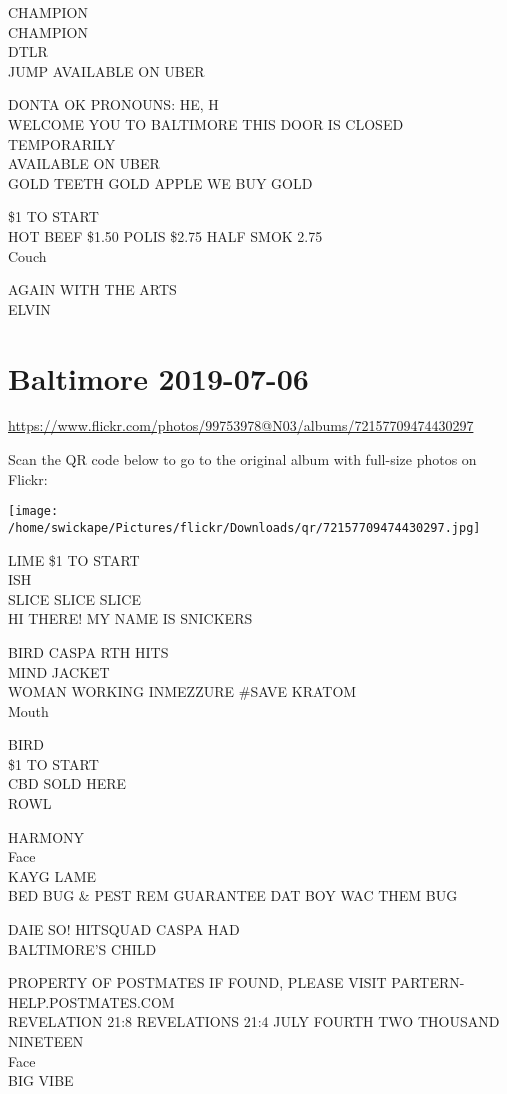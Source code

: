 \documentclass[10pt,letterpaper]{article}
\begin{document}
CHAMPION\\
CHAMPION\\
DTLR\\
JUMP AVAILABLE ON UBER

DONTA OK PRONOUNS: HE, H\\
WELCOME YOU TO BALTIMORE THIS DOOR IS CLOSED TEMPORARILY\\
AVAILABLE ON UBER\\
GOLD TEETH GOLD APPLE WE BUY GOLD

\$1 TO START\\
HOT BEEF \$1.50 POLIS \$2.75 HALF SMOK 2.75\\
Couch

AGAIN WITH THE ARTS\\
ELVIN


\section*{Baltimore 2019-07-06}

\url{https://www.flickr.com/photos/99753978@N03/albums/72157709474430297}

Scan the QR code below to go to the original album with full-size photos on Flickr:

\texttt{[image: /home/swickape/Pictures/flickr/Downloads/qr/72157709474430297.jpg]}


LIME \$1 TO START\\
ISH\\
SLICE SLICE SLICE\\
HI THERE!  MY NAME IS SNICKERS

BIRD CASPA RTH HITS\\
MIND JACKET\\
WOMAN WORKING INMEZZURE \#SAVE KRATOM\\
Mouth

BIRD\\
\$1 TO START\\
CBD SOLD HERE\\
ROWL

HARMONY\\
Face\\
KAYG LAME\\
BED BUG \& PEST REM GUARANTEE DAT BOY WAC THEM BUG

DAIE SO! HITSQUAD CASPA HAD\\
BALTIMORE'S CHILD

PROPERTY OF POSTMATES IF FOUND, PLEASE VISIT PARTERN{-}HELP.POSTMATES.COM\\
REVELATION 21:8 REVELATIONS 21:4 JULY FOURTH TWO THOUSAND NINETEEN\\
Face\\
BIG VIBE
\end{document}

